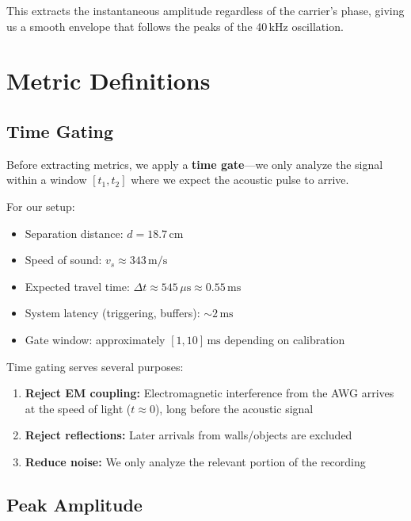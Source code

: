 \documentclass[11pt]{article}
\begin{document}
This extracts the instantaneous amplitude regardless of the carrier's phase, giving us a smooth envelope that follows the peaks of the 40\,kHz oscillation.

\section{Metric Definitions}

\subsection{Time Gating}

Before extracting metrics, we apply a \textbf{time gate}---we only analyze the signal within a window $[t_1, t_2]$ where we expect the acoustic pulse to arrive.

For our setup:
\begin{itemize}
    \item Separation distance: $d = 18.7\,\text{cm}$
    \item Speed of sound: $v_s \approx 343\,\text{m/s}$
    \item Expected travel time: $\Delta t \approx 545\,\mu\text{s} \approx 0.55\,\text{ms}$
    \item System latency (triggering, buffers): $\sim 2\,\text{ms}$
    \item Gate window: approximately $[1, 10]\,\text{ms}$ depending on calibration
\end{itemize}

Time gating serves several purposes:
\begin{enumerate}
    \item \textbf{Reject EM coupling:} Electromagnetic interference from the AWG arrives at the speed of light ($t \approx 0$), long before the acoustic signal
    \item \textbf{Reject reflections:} Later arrivals from walls/objects are excluded
    \item \textbf{Reduce noise:} We only analyze the relevant portion of the recording
\end{enumerate}

\subsection{Peak Amplitude}
\end{document}
